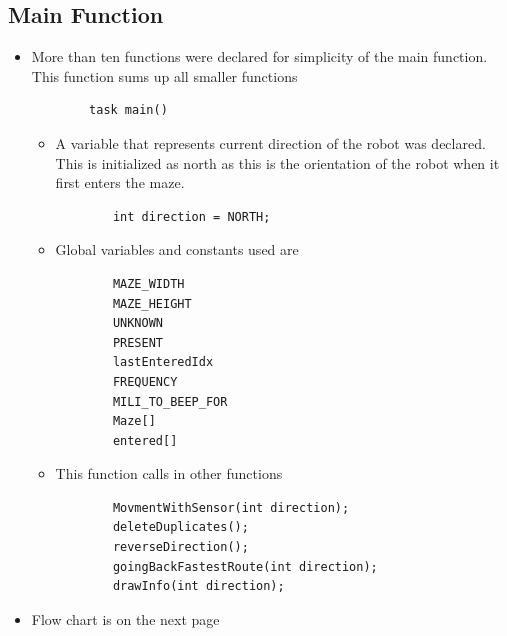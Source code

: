 \documentclass[11pt]{article}
\begin{document}

\subsection{Main Function}
\begin{itemize}
\item More than ten functions were declared for simplicity of the main function. This function sums up all smaller functions
	\begin{verbatim}
		task main()
	\end{verbatim}

	\begin{itemize}
	\item A variable that represents current direction of the robot was declared. This is initialized as north as this is the orientation of the robot when it first enters the maze.
	\begin{verbatim}
		int direction = NORTH;
	\end{verbatim}
	\item Global variables and constants used are
	\begin{verbatim}
		MAZE_WIDTH
		MAZE_HEIGHT
		UNKNOWN
		PRESENT
		lastEnteredIdx
		FREQUENCY
		MILI_TO_BEEP_FOR
		Maze[]
		entered[]
	\end{verbatim}
	\item This function calls in other functions
	\begin{verbatim}
		MovmentWithSensor(int direction);
		deleteDuplicates();
		reverseDirection();
		goingBackFastestRoute(int direction);
		drawInfo(int direction);
	\end{verbatim}
	\end{itemize}
\item Flow chart is on the next page
\end{itemize}
\end{document}
